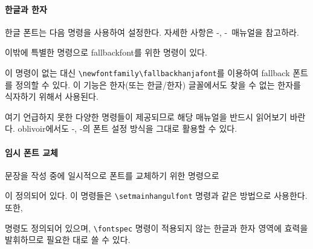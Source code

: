 \documentclass[
	12pt,
	a4paper,
	kosection,
	footnote,
	nobookmarks,
	microtype,
	figtabcapt,
]{oblivoir}
\def\cs#1{\texttt{\textbackslash #1}}
\def\xetexko{\XeTeX-\ko}
\def\luatexko{\LuaTeX-\ko}
\begin{document}
\paragraph{한글과 한자}
한글 폰트는 다음 명령을 사용하여 설정한다. 자세한 사항은 \xetexko, \luatexko\ 매뉴얼을 참고하라.
\begin{boxedverbatim}
\end{boxedverbatim}

이밖에 특별한 명령으로  fallbackfont를 위한 명령이 있다.
\begin{boxedverbatim}
\setmainfallbackfont
\setsansfallbackfont
\setmonofallbackfont
\end{boxedverbatim}
 이 명령이 없는 대신 \cs{newfontfamily}\cs{fallbackhanjafont}를 이용하여
fallback 폰트를 정의할 수 있다. 이 기능은 한자(또는 한글/한자) 글꼴에서도 찾을 수 없는 한자를
식자하기 위해서 사용된다.

여기 언급하지 못한 다양한 명령들이 제공되므로 해당 매뉴얼을 반드시 읽어보기 바란다.
oblivoir에서도 \xetexko, \luatexko 의 폰트 설정 방식을 그대로 활용할 수 있다.

%

\paragraph{임시 폰트 교체}
문장을 작성 중에 일시적으로 폰트를 교체하기 위한 명령으로 
\begin{boxedverbatim}
\adhochangulfont
\adhochanjafont
\end{boxedverbatim}
이 정의되어 있다. 이 명령들은 \verb|\setmainhangulfont| 명령과 같은 방법으로 사용한다. 또한, 
\begin{boxedverbatim}
\hangulfontspec
\hanjafontspec
\end{boxedverbatim}
명령도 정의되어 있으며, \verb|\fontspec| 명령이 적용되지 않는 한글과 한자 영역에 효력을 발휘하므로 필요한 대로 쓸 수 있다.
\end{document}
